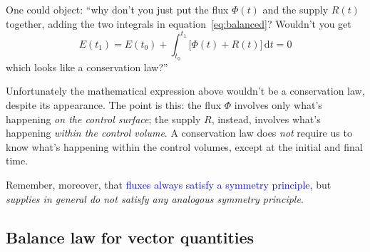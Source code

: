 \documentclass[a4paper,12pt,%
onecolumn,oneside,%
british%
]{memoir}
\newcommand*{\di}{\mathrm{d}}%
\renewcommand*{\|}[1][]{\nonscript\:#1\vert\nonscript\:\mathopen{}}
\newcommand*{\sect}{\S}%
\renewcommand*{\autoref}[2]{\sidepar{\vspace{-1ex}\footnotesize{\color{blue}\faIcon{%
angle-right%
}\enskip\sect~\ref{#1} page~\pageref{#1}}}\textcolor{blue}{#2}}
\newcommand*{\yti}{t_{0}}
\newcommand*{\ytf}{t_{1}}
\newcommand*{\yE}{E}
\newcommand*{\yH}{\varPhi}%
\newcommand*{\yR}{R}%
\begin{document}
\begin{warning}
  One could object: \enquote{why don't you just put the flux $\yH(t)$ and the supply $\yR(t)$ together, adding the two integrals in equation~\eqref{eq:balanced}? Wouldn't you get
  \begin{equation*}
    \yE(\ytf) = \yE(\yti) + \int_{\yti}^{\ytf}\!\!\bigl[\yH(t)+\yR(t)\bigr]\, \di t = 0
  \end{equation*}
  which looks like a conservation law?}

\medskip

Unfortunately the mathematical expression above wouldn't be a conservation law, despite its appearance. The point is this: the flux $\yH$ involves only what's happening \emph{on the control surface}; the supply $\yR$, instead, involves what's happening \emph{within the control volume}. A conservation law does \emph{not} require us to know what's happening within the control volumes, except at the initial and final time.

\smallskip

Remember, moreover, that \autoref{def:symmetryflux}{fluxes always satisfy a symmetry principle}, but \emph{supplies in general do not satisfy any analogous symmetry principle}.
\end{warning}



\subsection{Balance law for vector quantities}
\label{sec:balance_laws_vect}
\end{document}
